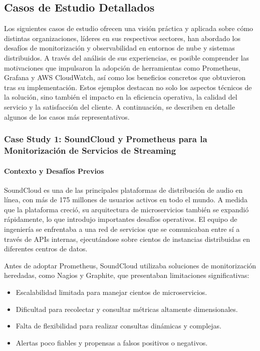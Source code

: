 {        \subsection{Casos de Estudio Detallados}
            Los siguientes casos de estudio ofrecen una visión práctica y aplicada sobre cómo distintas organizaciones, líderes en sus respectivos sectores, han abordado los desafíos de monitorización y observabilidad en entornos de nube y sistemas distribuidos. A través del análisis de sus experiencias, es posible comprender las motivaciones que impulsaron la adopción de herramientas como Prometheus, Grafana y AWS CloudWatch, así como los beneficios concretos que obtuvieron tras su implementación. Estos ejemplos destacan no solo los aspectos técnicos de la solución, sino también el impacto en la eficiencia operativa, la calidad del servicio y la satisfacción del cliente. A continuación, se describen en detalle algunos de los casos más representativos.

            \subsubsection{Case Study 1: SoundCloud y Prometheus para la Monitorización de Servicios de Streaming}
                \paragraph{Contexto y Desafíos Previos}  
                SoundCloud es una de las principales plataformas de distribución de audio en línea, con más de 175 millones de usuarios activos en todo el mundo. A medida que la plataforma creció, su arquitectura de microservicios también se expandió rápidamente, lo que introdujo importantes desafíos operativos. El equipo de ingeniería se enfrentaba a una red de servicios que se comunicaban entre sí a través de APIs internas, ejecutándose sobre cientos de instancias distribuidas en diferentes centros de datos.
                
                Antes de adoptar Prometheus, SoundCloud utilizaba soluciones de monitorización heredadas, como Nagios y Graphite, que presentaban limitaciones significativas:
                \begin{itemize}
                    \item Escalabilidad limitada para manejar cientos de microservicios.
                    \item Dificultad para recolectar y consultar métricas altamente dimensionales.
                    \item Falta de flexibilidad para realizar consultas dinámicas y complejas.
                    \item Alertas poco fiables y propensas a falsos positivos o negativos.
                \end{itemize}
                
}
